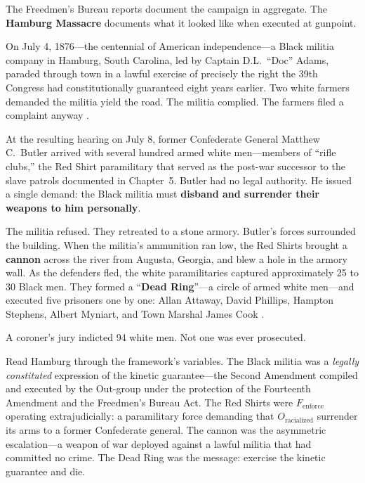 \documentclass[12pt,openany]{book}
\begin{document}
The Freedmen's Bureau reports document the campaign in aggregate. The \textbf{Hamburg Massacre} documents what it looked like when executed at gunpoint.

\begin{historicalsource}
On July 4, 1876---the centennial of American independence---a Black militia company in Hamburg, South Carolina, led by Captain D.L.\ ``Doc'' Adams, paraded through town in a lawful exercise of precisely the right the 39th Congress had constitutionally guaranteed eight years earlier. Two white farmers demanded the militia yield the road. The militia complied. The farmers filed a complaint anyway \cite{hamburg_zinn, hamburg_ldhi}.

At the resulting hearing on July 8, former Confederate General Matthew C.\ Butler arrived with several hundred armed white men---members of ``rifle clubs,'' the Red Shirt paramilitary that served as the post-war successor to the slave patrols documented in Chapter~5. Butler had no legal authority. He issued a single demand: the Black militia must \textbf{disband and surrender their weapons to him personally}.

The militia refused. They retreated to a stone armory. Butler's forces surrounded the building. When the militia's ammunition ran low, the Red Shirts brought a \textbf{cannon} across the river from Augusta, Georgia, and blew a hole in the armory wall. As the defenders fled, the white paramilitaries captured approximately 25 to 30 Black men. They formed a ``\textbf{Dead Ring}''---a circle of armed white men---and executed five prisoners one by one: Allan Attaway, David Phillips, Hampton Stephens, Albert Myniart, and Town Marshal James Cook \cite{hamburg_zinn, hamburg_ldhi}.

A coroner's jury indicted 94 white men. Not one was ever prosecuted.
\end{historicalsource}

Read Hamburg through the framework's variables. The Black militia was a \textit{legally constituted} expression of the kinetic guarantee---the Second Amendment compiled and executed by the Out-group under the protection of the Fourteenth Amendment and the Freedmen's Bureau Act. The Red Shirts were $F_{\text{enforce}}$ operating extrajudicially: a paramilitary force demanding that $O_{\text{racialized}}$ surrender its arms to a former Confederate general. The cannon was the asymmetric escalation---a weapon of war deployed against a lawful militia that had committed no crime. The Dead Ring was the message: exercise the kinetic guarantee and die.
\end{document}
